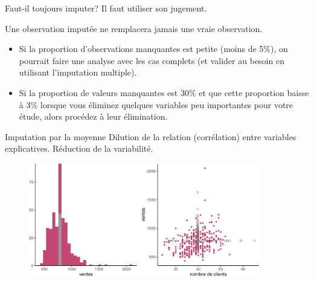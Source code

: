 \documentclass[
  ignorenonframetext,
]{beamer}
\providecommand{\tightlist}{%
  \setlength{\itemsep}{0pt}\setlength{\parskip}{0pt}}\usepackage{longtable,booktabs,array}
\begin{document}
\begin{frame}{Faut-il toujours imputer?}
\protect\hypertarget{faut-il-toujours-imputer}{}
Il faut utiliser son jugement.

Une observation imputée ne remplacera jamais une vraie observation.

\begin{itemize}
\tightlist
\item
  Si la proportion d'observations manquantes est petite (moins de 5\%),
  on pourrait faire une analyse avec les cas complets (et valider au
  besoin en utilisant l'imputation multiple).
\item
  Si la proportion de valeurs manquantes est 30\% et que cette
  proportion baisse à 3\% lorsque vous éliminez quelques variables peu
  importantes pour votre étude, alors procédez à leur élimination.
\end{itemize}
\end{frame}

\begin{frame}{Imputation par la moyenne}
\protect\hypertarget{imputation-par-la-moyenne}{}
Dilution de la relation (corrélation) entre variables explicatives.
Réduction de la variabilité.

\begin{figure}

{\centering \includegraphics[width=0.9\textwidth,height=\textheight]{MATH60602-diapos13_files/figure-beamer/unnamed-chunk-2-1.pdf}

}

\end{figure}
\end{frame}
\end{document}
